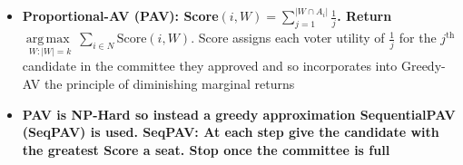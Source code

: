\documentclass[20pt,a4paper,landscape]{extarticle}
\DeclareMathOperator*{\argmax}{arg\,max\:}
\begin{document}
\begin{flushleft}
\begin{itemize}
\item \textbf{Proportional-AV (PAV): Score$(i, W) = \sum_{j=1}^{|W \cap A_i|} \frac{1}{j}$. Return $\underset{W: |W| = k}{\argmax}\sum_{i \in N}\textrm{Score}(i, W)$}. Score assigns each voter utility of $\frac{1}{j}$ for the $j^\textrm{th}$ candidate in the committee they approved and so incorporates into Greedy-AV the principle of diminishing marginal returns
\item \textbf{PAV is NP-Hard so instead a greedy approximation SequentialPAV (SeqPAV) is used. SeqPAV: At each step give the candidate with the greatest Score a seat. Stop once the committee is full}
\end{itemize}
\clearpage

\end{flushleft}
\end{document}
